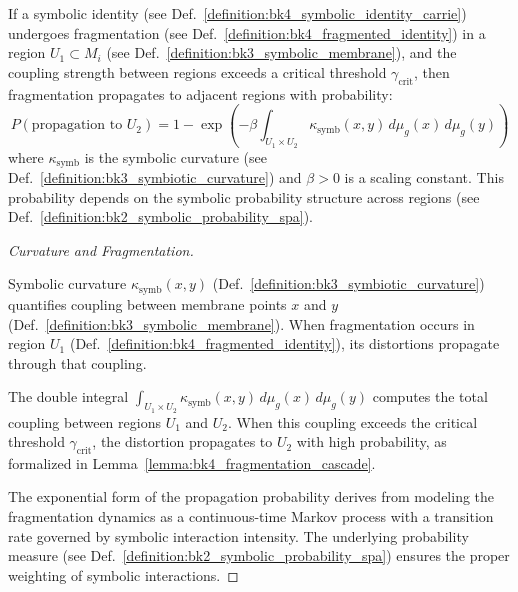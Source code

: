 \begin{lemma} \label{lemma:bk4_fragmentation_cascade}
If a symbolic identity (see Def.~\ref{definition:bk4_symbolic_identity_carrie}) undergoes fragmentation (see Def.~\ref{definition:bk4_fragmented_identity}) in a region $U_1 \subset M_i$ (see Def.~\ref{definition:bk3_symbolic_membrane}), and the coupling strength between regions exceeds a critical threshold $\gamma_{\text{crit}}$, then fragmentation propagates to adjacent regions with probability:
\begin{equation}
    P(\text{propagation to } U_2) = 1 - \exp\left(-\beta \int_{U_1 \times U_2} \kappa_{\text{symb}}(x,y) \, d\mu_g(x) \, d\mu_g(y)\right)
\end{equation}
where $\kappa_{\text{symb}}$ is the symbolic curvature (see Def.~\ref{definition:bk3_symbiotic_curvature}) and $\beta > 0$ is a scaling constant. This probability depends on the symbolic probability structure across regions (see Def.~\ref{definition:bk2_symbolic_probability_spa}).
\end{lemma}
\begin{proof}[Curvature and Fragmentation]
\label{proof:bk4_symbolic_curvature_fragmentation}
\leavevmode

Symbolic curvature $\kappa_{\text{symb}}(x,y)$
(Def.~\ref{definition:bk3_symbiotic_curvature}) quantifies coupling between
membrane points $x$ and $y$ (Def.~\ref{definition:bk3_symbolic_membrane}).
When fragmentation occurs in region $U_1$
(Def.~\ref{definition:bk4_fragmented_identity}), its distortions propagate
through that coupling.

The double integral $\int_{U_1 \times U_2} \kappa_{\text{symb}}(x,y) \, d\mu_g(x) \, d\mu_g(y)$ computes the total coupling between regions $U_1$ and $U_2$. When this coupling exceeds the critical threshold $\gamma_{\text{crit}}$, the distortion propagates to $U_2$ with high probability, as formalized in Lemma~\ref{lemma:bk4_fragmentation_cascade}.

The exponential form of the propagation probability derives from modeling the fragmentation dynamics as a continuous-time Markov process with a transition rate governed by symbolic interaction intensity. The underlying probability measure (see Def.~\ref{definition:bk2_symbolic_probability_spa}) ensures the proper weighting of symbolic interactions.
\end{proof}

